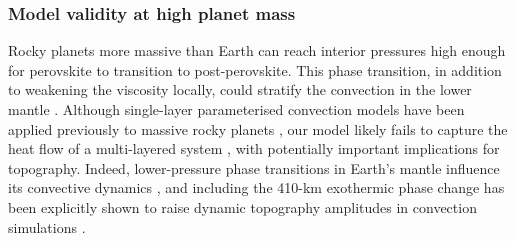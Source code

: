 \documentclass[trackchanges]{aastex63}
\newcommand{\todo}[1]{\textit{\textcolor{violet}{{#1}}}}
\begin{document}
\subsubsection{Model validity at high planet mass}

Rocky planets more massive than Earth can reach interior pressures high enough for perovskite to transition to post-perovskite. This phase transition, in addition to weakening the viscosity locally, could stratify the convection in the lower mantle \citep{umemoto_two-stage_2011, karato_rheological_2011, tackley_mantle_2013, umemoto_phase_2017, shahnas_penetrative_2018, ritterbex_vacancies_2018, van_den_berg_mass-dependent_2019}. Although single-layer parameterised convection models have been applied previously to massive rocky planets \citep[e.g.,][]{kite_geodynamics_2009, tosi_habitability_2017}, our model likely fails to capture the heat flow of a multi-layered system \citep{2007GeoJI.169..747V}, with potentially important implications for topography. Indeed, lower-pressure phase transitions in Earth's mantle influence its convective dynamics \citep{doi:10.1146/annurev.ea.23.050195.000433}, and including the 410-km exothermic phase change has been explicitly shown to raise dynamic topography amplitudes in convection simulations \citep{2021GeoJI.225.1637Y}.


\end{document}
